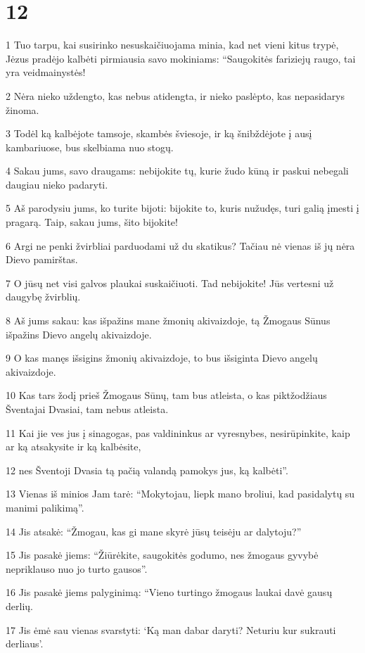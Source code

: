 \chapter{12}


\par 1 Tuo tarpu, kai susirinko nesuskaičiuojama minia, kad net vieni kitus trypė, Jėzus pradėjo kalbėti pirmiausia savo mokiniams: “Saugokitės fariziejų raugo, tai yra veidmainystės! 
\par 2 Nėra nieko uždengto, kas nebus atidengta, ir nieko paslėpto, kas nepasidarys žinoma. 
\par 3 Todėl ką kalbėjote tamsoje, skambės šviesoje, ir ką šnibždėjote į ausį kambariuose, bus skelbiama nuo stogų. 
\par 4 Sakau jums, savo draugams: nebijokite tų, kurie žudo kūną ir paskui nebegali daugiau nieko padaryti. 
\par 5 Aš parodysiu jums, ko turite bijoti: bijokite to, kuris nužudęs, turi galią įmesti į pragarą. Taip, sakau jums, šito bijokite! 
\par 6 Argi ne penki žvirbliai parduodami už du skatikus? Tačiau nė vienas iš jų nėra Dievo pamirštas. 
\par 7 O jūsų net visi galvos plaukai suskaičiuoti. Tad nebijokite! Jūs vertesni už daugybę žvirblių. 
\par 8 Aš jums sakau: kas išpažins mane žmonių akivaizdoje, tą Žmogaus Sūnus išpažins Dievo angelų akivaizdoje. 
\par 9 O kas manęs išsigins žmonių akivaizdoje, to bus išsiginta Dievo angelų akivaizdoje. 
\par 10 Kas tars žodį prieš Žmogaus Sūnų, tam bus atleista, o kas piktžodžiaus Šventajai Dvasiai, tam nebus atleista. 
\par 11 Kai jie ves jus į sinagogas, pas valdininkus ar vyresnybes, nesirūpinkite, kaip ar ką atsakysite ir ką kalbėsite, 
\par 12 nes Šventoji Dvasia tą pačią valandą pamokys jus, ką kalbėti”. 
\par 13 Vienas iš minios Jam tarė: “Mokytojau, liepk mano broliui, kad pasidalytų su manimi palikimą”. 
\par 14 Jis atsakė: “Žmogau, kas gi mane skyrė jūsų teisėju ar dalytoju?” 
\par 15 Jis pasakė jiems: “Žiūrėkite, saugokitės godumo, nes žmogaus gyvybė nepriklauso nuo jo turto gausos”. 
\par 16 Jis pasakė jiems palyginimą: “Vieno turtingo žmogaus laukai davė gausų derlių. 
\par 17 Jis ėmė sau vienas svarstyti: ‘Ką man dabar daryti? Neturiu kur sukrauti derliaus’. 
